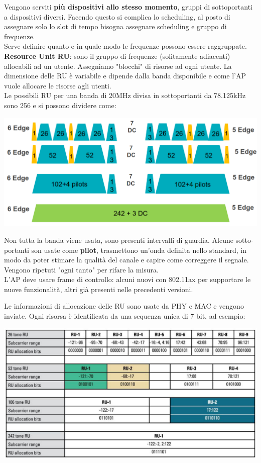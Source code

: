 Vengono serviti \textbf{più dispositivi allo stesso momento}, gruppi di sottoportanti a dispositivi diversi. Facendo questo si complica lo scheduling, al posto di assegnare solo lo slot di tempo bisogna assegnare scheduling e gruppo di frequenze.\\

Serve definire quanto e in quale modo le frequenze possono essere raggruppate. \textbf{Resource Unit RU}: sono il gruppo di frequenze (solitamente adiacenti) allocabili ad un utente. Assegniamo "blocchi" di risorse ad ogni utente. La dimensione delle RU è variabile e dipende dalla banda disponibile e come l'AP vuole allocare le risorse agli utenti.\\

Le possibili RU per una banda di 20MHz divisa in sottoportanti da 78.125kHz sono 256 e si possono dividere come:
\begin{center}
	\includegraphics[width=0.8\linewidth]{img/wlan/ru1}
\end{center}

Non tutta la banda viene usata, sono presenti intervalli di guardia. Alcune sotto-portanti son usate come \textbf{pilot}, trasmettono un'onda definita nello standard, in modo da poter stimare la qualità del canale e capire come correggere il segnale. Vengono ripetuti "ogni tanto" per rifare la misura.\\

L'AP deve usare frame di controllo: alcuni nuovi con 802.11ax per supportare le nuove funzionalità, altri già presenti nelle precedenti versioni.\\

\newpage

Le informazioni di allocazione delle RU sono usate da PHY e MAC e vengono inviate. Ogni risorsa è identificata da una sequenza unica di 7 bit, ad esempio:
\begin{center}
	\includegraphics[width=0.75\linewidth]{img/wlan/tab3}
\end{center}

